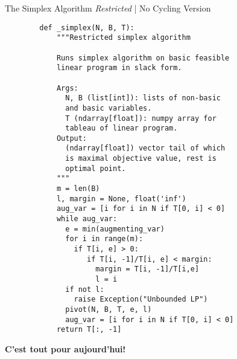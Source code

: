 \documentclass[aspectratio = 169]{beamer}
\begin{document}
\begin{frame}[fragile]{The Simplex Algorithm \emph{Restricted} | No Cycling Version}
  \begin{overlayarea}{1.1\textwidth}{.75\textheight}
  \setlength{\columnsep}{-10pt}
  \begin{multicols}{2}
    \scriptsize{
      \begin{verbatim}
        def _simplex(N, B, T):
            """Restricted simplex algorithm

            Runs simplex algorithm on basic feasible
            linear program in slack form.

            Args:
              N, B (list[int]): lists of non-basic
              and basic variables.
              T (ndarray[float]): numpy array for
              tableau of linear program.
            Output:
              (ndarray[float]) vector tail of which
              is maximal objective value, rest is
              optimal point.
            """
            m = len(B)
            l, margin = None, float('inf')
            aug_var = [i for i in N if T[0, i] < 0]
            while aug_var:
              e = min(augmenting_var)
              for i in range(m):
                if T[i, e] > 0:
                   if T[i, -1]/T[i, e] < margin:
                     margin = T[i, -1]/T[i,e]
                     l = i
              if not l:
                raise Exception("Unbounded LP")
              pivot(N, B, T, e, l)
              aug_var = [i for i in N if T[0, i] < 0]
            return T[:, -1]
      \end{verbatim}
    }
  \end{multicols}
  \end{overlayarea}
\end{frame}

\begin{frame}
  \centering
  {\huge \textbf{C'est tout pour aujourd'hui!}}
\end{frame}
\end{document}
